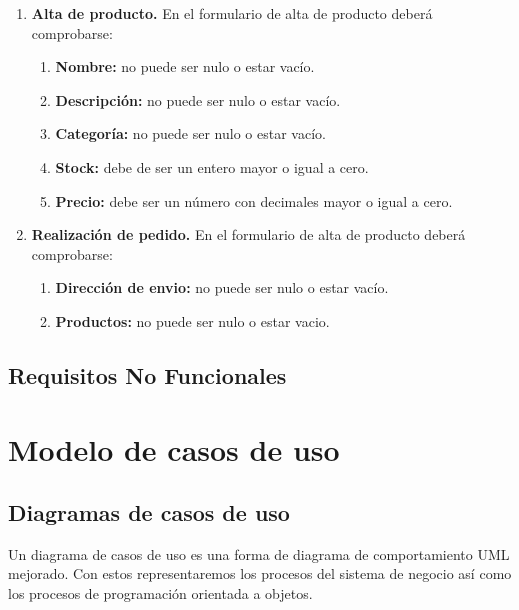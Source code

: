 \begin{enumerate}[leftmargin=1.75cm,start=1,label={\bfseries RS-\arabic*.}]
    \item \textbf{Alta de producto.} En el formulario de alta de producto deberá comprobarse:
    \begin{enumerate}[start=1,label={\bfseries RS-6.\arabic*.}]
        \item \textbf{Nombre:} no puede ser nulo o estar vacío.
        \item \textbf{Descripción:} no puede ser nulo o estar vacío.
        \item \textbf{Categoría:} no puede ser nulo o estar vacío.
        \item \textbf{Stock:} debe de ser un entero mayor o igual a cero.
        \item \textbf{Precio:} debe ser un número con decimales mayor o igual a cero.
    \end{enumerate}
    
    \item \textbf{Realización de pedido.} En el formulario de alta de producto deberá comprobarse:
    \begin{enumerate}[start=1,label={\bfseries RS-7.\arabic*.}]
        \item \textbf{Dirección de envio:} no puede ser nulo o estar vacío.
        \item \textbf{Productos:} no puede ser nulo o estar vacio.
    \end{enumerate}
\end{enumerate}

\subsection{Requisitos No Funcionales}

\section{Modelo de casos de uso}

\subsection{Diagramas de casos de uso}

Un diagrama de casos de uso es una forma de diagrama de comportamiento UML mejorado. Con estos representaremos
los procesos del sistema de negocio así como los procesos de programación orientada a objetos.\\


